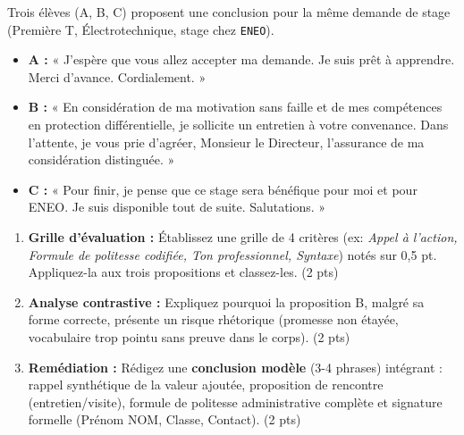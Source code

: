 \documentclass[11pt]{article}
\begin{document}
\begin{exercice}
Trois élèves (A, B, C) proposent une conclusion pour la même demande de stage (Première T, Électrotechnique, stage chez \texttt{ENEO}).

\begin{itemize}
    \item \textbf{A :} « J'espère que vous allez accepter ma demande. Je suis prêt à apprendre. Merci d'avance. Cordialement. »
    \item \textbf{B :} « En considération de ma motivation sans faille et de mes compétences en protection différentielle, je sollicite un entretien à votre convenance. Dans l'attente, je vous prie d'agréer, Monsieur le Directeur, l'assurance de ma considération distinguée. »
    \item \textbf{C :} « Pour finir, je pense que ce stage sera bénéfique pour moi et pour ENEO. Je suis disponible tout de suite. Salutations. »
\end{itemize}

\begin{enumerate}
    \item \textbf{Grille d'évaluation :} Établissez une grille de 4 critères (ex: \textit{Appel à l'action, Formule de politesse codifiée, Ton professionnel, Syntaxe}) notés sur 0,5 pt. Appliquez-la aux trois propositions et classez-les. \hfill (2 pts)
    \item \textbf{Analyse contrastive :} Expliquez pourquoi la proposition B, malgré sa forme correcte, présente un risque rhétorique (promesse non étayée, vocabulaire trop pointu sans preuve dans le corps). \hfill (2 pts)
    \item \textbf{Remédiation :} Rédigez une \textbf{conclusion modèle} (3-4 phrases) intégrant : rappel synthétique de la valeur ajoutée, proposition de rencontre (entretien/visite), formule de politesse administrative complète et signature formelle (Prénom NOM, Classe, Contact). \hfill (2 pts)
\end{enumerate}
\end{exercice}
\end{document}
